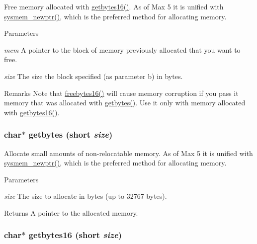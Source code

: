 Free memory allocated with \hyperlink{group__memory_ga198147e2629edde67218d8a759e9d5a0}{getbytes16()}. As of Max 5 it is unified with \hyperlink{group__memory_ga276676be214edff9fe5c9d0681f39ae6}{sysmem\_\-newptr()}, which is the preferred method for allocating memory.


\begin{DoxyParams}{Parameters}
\item[{\em mem}]A pointer to the block of memory previously allocated that you want to free. \item[{\em size}]The size the block specified (as parameter b) in bytes.\end{DoxyParams}
\begin{DoxyRemark}{Remarks}
Note that \hyperlink{group__memory_gafba42d2b23405e29469392394cf41555}{freebytes16()} will cause memory corruption if you pass it memory that was allocated with \hyperlink{group__memory_gaa513b95a076519ec168b62d85881f643}{getbytes()}. Use it only with memory allocated with \hyperlink{group__memory_ga198147e2629edde67218d8a759e9d5a0}{getbytes16()}. 
\end{DoxyRemark}
\hypertarget{group__memory_gaa513b95a076519ec168b62d85881f643}{
\subsubsection[{getbytes}]{\setlength{\rightskip}{0pt plus 5cm}char$\ast$ getbytes (short {\em size})}}
\label{group__memory_gaa513b95a076519ec168b62d85881f643}


Allocate small amounts of non-\/relocatable memory. As of Max 5 it is unified with \hyperlink{group__memory_ga276676be214edff9fe5c9d0681f39ae6}{sysmem\_\-newptr()}, which is the preferred method for allocating memory.


\begin{DoxyParams}{Parameters}
\item[{\em size}]The size to allocate in bytes (up to 32767 bytes). \end{DoxyParams}
\begin{DoxyReturn}{Returns}
A pointer to the allocated memory. 
\end{DoxyReturn}
\hypertarget{group__memory_ga198147e2629edde67218d8a759e9d5a0}{
\subsubsection[{getbytes16}]{\setlength{\rightskip}{0pt plus 5cm}char$\ast$ getbytes16 (short {\em size})}}
\label{group__memory_ga198147e2629edde67218d8a759e9d5a0}


